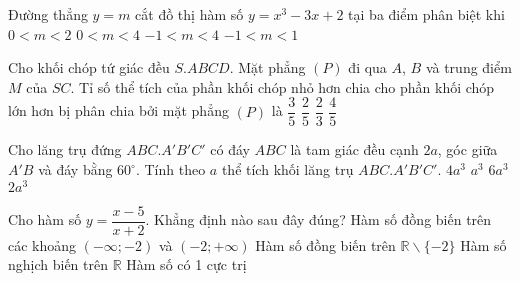 \begin{ex}%
Đường thẳng $y=m$ cắt đồ thị hàm số $y=x^{3}-3x+2$ tại ba điểm phân biệt khi
\choice
{$0<m<2$}
{\True $0<m<4$}
{$-1<m<4$}
{$-1<m<1$}
\end{ex}
\begin{ex}%
Cho khối chóp tứ giác đều $S.ABCD$. Mặt phẳng $(P)$ đi qua $A$, $B$ và trung điểm $M$ của $SC$. Tỉ số thể tích của phần khối chóp nhỏ hơn chia cho phần khối chóp lớn hơn bị phân chia bởi mặt phẳng $(P)$ là
\choice
{\True $\dfrac{3}{5}$}
{$\dfrac{2}{5}$}
{$\dfrac{2}{3}$}
{$\dfrac{4}{5}$}
\end{ex}
\begin{ex}%
Cho lăng trụ đứng $ABC.A'B'C'$ có đáy $ABC$ là tam giác đều cạnh $2a$, góc giữa $A'B$ và đáy bằng $60^{\circ}$. Tính theo $a$ thể tích khối lăng trụ $ABC.A'B'C'$.
\choice
{$4a^{3}$}
{$a^{3}$}
{\True $6a^{3}$}
{$2a^{3}$}
\end{ex}
\begin{ex}%
Cho hàm số $y=\dfrac{x-5}{x+2}$. Khẳng định nào sau đây đúng?
\choice
{\True Hàm số đồng biến trên các khoảng $(-\infty;-2)$ và $(-2;+\infty)$}
{Hàm số đồng biến trên $\mathbb R\backslash\{-2\}$}
{Hàm số nghịch biến trên $\mathbb R$}
{Hàm số có 1 cực trị}
\end{ex}
\begin{ex}%
{
\hspace*{0.5cm}
}
\end{ex}
